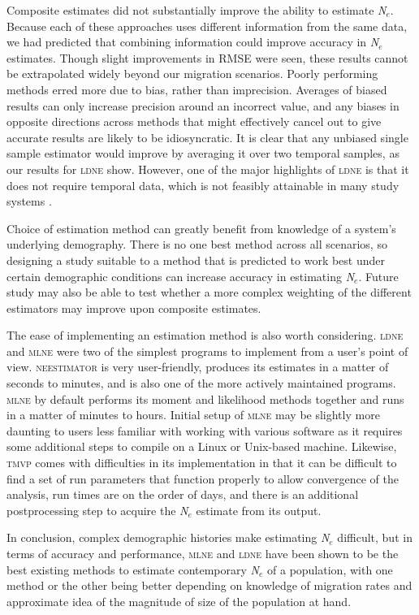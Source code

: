Composite estimates did not substantially improve the ability to estimate \emph{N}$_e$. 
Because each of these approaches uses different information from the same data, we had predicted 
that combining information could improve accuracy in \emph{N}$_e$ estimates. Though slight 
improvements in RMSE were seen, these results cannot be extrapolated widely beyond our migration 
scenarios. Poorly performing methods erred more due to bias, rather than imprecision. Averages 
of biased results can only increase precision around an incorrect value, and any biases in 
opposite directions across methods that might effectively cancel out to give accurate results 
are likely to be idiosyncratic. It is clear that any unbiased single sample estimator would 
improve by averaging it over two temporal samples, as our results for \textsc{ldne} show. 
However, one of the major highlights of \textsc{ldne} is that it does not require temporal 
data, which is not feasibly attainable in many study systems \citep{Waples:2008}.

Choice of estimation method can greatly benefit from knowledge of a system's underlying 
demography. There is no one best method across all scenarios, so designing a study suitable to 
a method that is predicted to work best under certain demographic conditions can increase 
accuracy in estimating \emph{N}$_e$. Future study may also be able to test whether a more 
complex weighting of the different estimators may improve upon composite estimates.

The ease of implementing an estimation method is also worth considering. \textsc{ldne} 
and \textsc{mlne} were two of the simplest programs to implement from a user's point of view. 
\textsc{neestimator} is very user-friendly, produces its estimates in a matter of seconds to
minutes, and is also one of the more actively maintained programs. \textsc{mlne} by default 
performs its moment and likelihood methods together and runs in a matter of minutes to hours. 
Initial setup of \textsc{mlne} may be slightly more daunting to users less familiar with 
working with various software as it requires some additional steps to compile on a Linux 
or Unix-based machine. Likewise, \textsc{tmvp} comes with difficulties in its implementation 
in that it can be difficult to find a set of run parameters that function properly to allow 
convergence of the analysis, run times are on the order of days, and there is an additional 
postprocessing step to acquire the \emph{N}$_e$ estimate from its output.

In conclusion, complex demographic histories make estimating \emph{N}$_e$ difficult, 
but in terms of accuracy and performance, \textsc{mlne} and \textsc{ldne} have been shown 
to be the best existing methods to estimate contemporary \emph{N}$_e$ of a population, 
with one method or the other being better depending on knowledge of migration rates and 
approximate idea of the magnitude of size of the population at hand.




